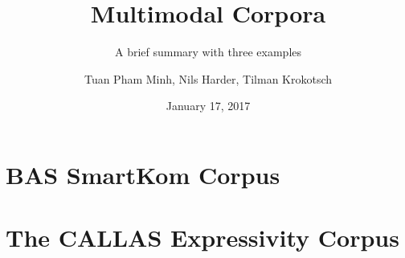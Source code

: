 \documentclass{beamer}
\title{Multimodal Corpora}
\subtitle{A brief summary with three examples}
\author{Tuan Pham Minh, Nils Harder, Tilman Krokotsch}
\date{January 17, 2017}
\begin{document}
	\beamertemplatenavigationsymbolsempty
	
	\setcounter{tocdepth}{1}

	\maketitle
	
	\begin{frame}
		\tableofcontents
	\end{frame}
	
	\section{BAS SmartKom Corpus} 	
	
	\section{The CALLAS Expressivity Corpus}			
\end{document}
